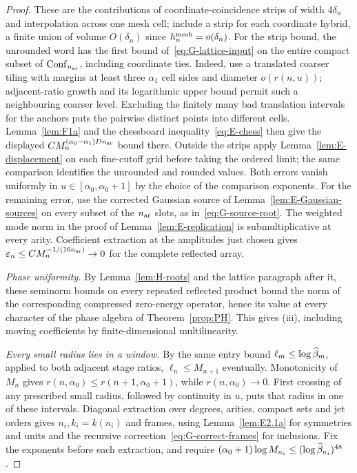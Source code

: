 \begin{proof}
These are the contributions of coordinate-coincidence strips of width $4\delta_n$ and interpolation across one mesh cell; include a strip for each coordinate hybrid, a finite union of volume $O(\delta_n)$ since $h^{\rm mesh}_n=o(\delta_n)$. For the strip bound, the unrounded word has the first bound of~\eqref{eq:G-lattice-input} on the entire compact subset of $\mathrm{Conf}_{n_{\rm ar}}$, including coordinate ties. Indeed, use a translated coarser tiling with margins at least three $\alpha_1$ cell sides and diameter $o(r(n,u))$; adjacent-ratio growth and its logarithmic upper bound permit such a neighbouring coarser level. Excluding the finitely many bad translation intervals for the anchors puts the pairwise distinct points into different cells. Lemma~\ref{lem:F1a} and the chessboard inequality~\eqref{eq:E-chess} then give the displayed $CM_n^{(\alpha_0-\alpha_1)Dn_{\rm ar}}$ bound there. Outside the strips apply Lemma~\ref{lem:E-displacement} on each fine-cutoff grid before taking the ordered limit; the same comparison identifies the unrounded and rounded values. Both errors vanish uniformly in $u\in[\alpha_0,\alpha_0+1]$ by the choice of the comparison exponents. For the remaining error, use the corrected Gaussian source of Lemma~\ref{lem:E-Gaussian-sources} on every subset of the $n_{\rm ar}$ slots, as in~\eqref{eq:G-source-root}. The weighted mode norm in the proof of Lemma~\ref{lem:E-replication} is submultiplicative at every arity. Coefficient extraction at the amplitudes just chosen gives $\varepsilon_n\le CM_n^{-1/(16n_{\rm ar})}\to0$ for the complete reflected array.

\emph{Phase uniformity.} By Lemma~\ref{lem:H-roots} and the lattice paragraph after it, these seminorm bounds on every repeated reflected product bound the norm of the corresponding compressed zero-energy operator, hence its value at every character of the phase algebra of Theorem~\ref{prop:PH}. This gives (iii), including moving coefficients by finite-dimensional multilinearity.

\emph{Every small radius lies in a window.} By the same entry bound $\ell_m\le\log\widehat{\beta}_m$, applied to both adjacent stage ratios, $\ell_n\le M_{n+1}$ eventually. Monotonicity of $M_n$ gives $r(n,\alpha_0)\le r(n+1,\alpha_0+1)$, while $r(n,\alpha_0)\to0$. First crossing of any prescribed small radius, followed by continuity in $u$, puts that radius in one of these intervals. Diagonal extraction over degrees, arities, compact sets and jet orders gives $n_i,k_i=k(n_i)$ and frames, using Lemma~\ref{lem:E2.1a} for symmetries and units and the recursive correction~\eqref{eq:G-correct-frames} for inclusions. Fix the exponents before each extraction, and require $(\alpha_0+1)\log M_{n_i}\le(\log\widehat{\beta}_{n_i})^{48}$.


\end{proof}
